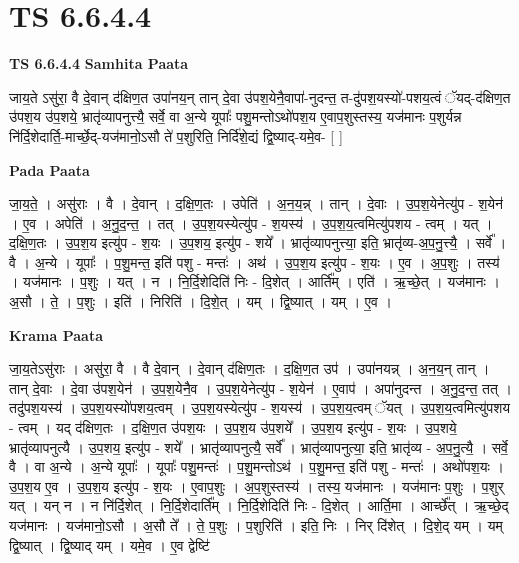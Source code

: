 \documentclass[17pt]{extarticle}
\begin{document}
\section{ TS 6.6.4.4 }

\textbf{TS 6.6.4.4 } \newline
\textbf{Samhita Paata} \newline

जाय॒ते ऽसु॑रा॒ वै दे॒वान् द॑क्षिण॒त उपा॑नय॒न् तान् दे॒वा उ॑पश॒येनै॒वापा॑-नुदन्त॒ त-दु॑पश॒यस्यो॑-पशय॒त्वं ॅयद्-द॑क्षिण॒त उ॑पश॒य उ॑प॒शये॒ भ्रातृ॑व्यापनुत्त्यै॒ सर्वे॒ वा अ॒न्ये यूपाः᳚ पशु॒मन्तोऽथो॑पश॒य ए॒वाप॒शुस्तस्य॒ यज॑मानः प॒शुर्यन्न नि॑र्दि॒शेदार्ति॒-मार्च्छे॒द्-यज॑मानो॒ऽसौ ते॑ प॒शुरिति॒ निर्दि॑शे॒द्यं द्वि॒ष्याद्-यमे॒व- [  ] \newline

\textbf{Pada Paata} \newline

जा॒य॒ते॒ । असु॑राः । वै । दे॒वान् । द॒क्षि॒ण॒तः । उपेति॑ । अ॒न॒य॒न्न् । तान् । दे॒वाः । उ॒प॒श॒येनेत्यु॑प - श॒येन॑ । ए॒व । अपेति॑ । अ॒नु॒द॒न्त॒ । तत् । उ॒प॒श॒यस्येत्यु॑प - श॒यस्य॑ । उ॒प॒श॒य॒त्वमित्यु॑पशय - त्वम् । यत् । द॒क्षि॒ण॒तः । उ॒प॒श॒य इत्यु॑प - श॒यः । उ॒प॒शय॒ इत्यु॑प - शये᳚ । भ्रातृ॑व्यापनुत्त्या॒ इति॒ भ्रातृ॑व्य-अ॒प॒नु॒त्त्यै॒ । सर्वे᳚ । वै । अ॒न्ये । यूपाः᳚ । प॒शु॒मन्त॒ इति॑ पशु - मन्तः॑ । अथ॑ । उ॒प॒श॒य इत्यु॑प - श॒यः । ए॒व । अ॒प॒शुः । तस्य॑ । यज॑मानः । प॒शुः । यत् । न । नि॒र्दि॒शेदिति॑ निः - दि॒शेत् । आर्ति᳚म् । एति॑ । ऋ॒च्छे॒त् । यज॑मानः । अ॒सौ । ते॒ । प॒शुः । इति॑ । निरिति॑ । दि॒शे॒त् । यम् । द्वि॒ष्यात् । यम् । ए॒व ।  \newline


\textbf{Krama Paata} \newline

जा॒य॒तेऽसु॑राः । असु॑रा॒ वै । वै दे॒वान् । दे॒वान् द॑क्षिण॒तः । द॒क्षि॒ण॒त उप॑ । उपा॑नयन्न् । अ॒न॒य॒न् तान् । तान् दे॒वाः । दे॒वा उ॑पश॒येन॑ । उ॒प॒श॒येनै॒व । उ॒प॒श॒येनेत्यु॑प - श॒येन॑ । ए॒वाप॑ । अपा॑नुदन्त । अ॒नु॒द॒न्त॒ तत् । तदु॑पश॒यस्य॑ । उ॒प॒श॒यस्यो॑पशय॒त्वम् । उ॒प॒श॒यस्येत्यु॑प - श॒यस्य॑ । उ॒प॒श॒य॒त्वम् ॅयत् । उ॒प॒श॒य॒त्वमित्यु॑पशय - त्वम् । यद् द॑क्षिण॒तः । द॒क्षि॒ण॒त उ॑पश॒यः । उ॒प॒श॒य उ॑प॒शये᳚ । उ॒प॒श॒य इत्यु॑प - श॒यः । उ॒प॒शये॒ भ्रातृ॑व्यापनुत्यै । उ॒प॒शय॒ इत्यु॑प - शये᳚ । भ्रातृ॑व्यापनुत्यै॒ सर्वे᳚ । भ्रातृ॑व्यापनुत्या॒ इति॒ भ्रातृ॑व्य - अ॒प॒नु॒त्यै॒ । सर्वे॒ वै । वा अ॒न्ये । अ॒न्ये यूपाः᳚ । यूपाः᳚ पशु॒मन्तः॑ । प॒शु॒मन्तोऽथ॑ । प॒शु॒मन्त॒ इति॑ पशु - मन्तः॑ । अथो॑पश॒यः । उ॒प॒श॒य ए॒व । उ॒प॒श॒य इत्यु॑प - श॒यः । ए॒वाप॒शुः । अ॒प॒शुस्तस्य॑ । तस्य॒ यज॑मानः । यज॑मानः प॒शुः । प॒शुर् यत् । यन् न । न नि॑र्दि॒शेत् । नि॒र्दि॒शेदार्ति᳚म् । नि॒र्दि॒शेदिति॑ निः - दि॒शेत् । आर्ति॒मा । आर्च्छे᳚त् । ऋ॒च्छे॒द् यज॑मानः । यज॑मानो॒ऽसौ । अ॒सौ ते᳚ । ते॒ प॒शुः । प॒शुरिति॑ । इति॒ निः । निर् दि॑शेत् । दि॒शे॒द् यम् । यम् द्वि॒ष्यात् । द्वि॒ष्याद् यम् । यमे॒व । ए॒व द्वेष्टि॑ \newline
\end{document}
